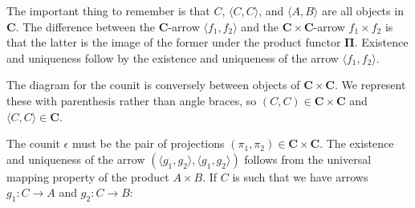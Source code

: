 \documentclass{article}
\newcommand{\ccat}{\mathbf{C}}
\newcommand{\pifun}{\mathbf{\Pi}}
\begin{document}
\begin{enumerate}
\begin{center}
  \end{center}
  The important thing to remember is that $C$, $\langle C , C \rangle$, and $\langle A , B \rangle$ are all objects in $\ccat$.
  The difference between the $\ccat$-arrow $\langle f_1 , f_2 \rangle$ and the $\ccat \times \ccat$-arrow $f_1 \times f_2$ is that the latter is the image of the former under the product functor $\pifun$.
  Existence and uniqueness follow by the existence and uniqueness of the arrow $\langle f_1, f_2 \rangle$.

  The diagram for the counit is conversely between objects of $\ccat \times \ccat$.
  We represent these with parenthesis rather than angle braces, so $(C,C) \in \ccat \times \ccat$ and $\langle C , C \rangle \in \ccat$.
  \begin{center}
  \end{center}
  The counit $\epsilon$ must be the pair of projections $(\pi_1 , \pi_2) \in \ccat \times \ccat$.
  The existence and uniqueness of the arrow $(\langle g_1 , g_2 \rangle , \langle g_1 , g_2 \rangle)$ follows from the universal mapping property of the product $A \times B$.
  If $C$ is such that we have arrows $g_1 : C \rightarrow A$ and $g_2 : C \rightarrow B$:

  \begin{center}
  \end{center}


\end{enumerate}
\end{document}
